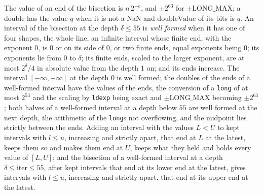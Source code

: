 \begin{lemma}\label{lem:bisection}
  \leanok
  The value of an end of the bisection is $n\,2^{-e}$, and $\pm 2^{63}$ for $\pm\mathrm{LONG\_MAX}$;
  a double has the value $q$ when it is not a NaN and $\mathrm{doubleValue}$ of its bits is $q$. An
  interval of the bisection at the depth $\delta \le 55$ is \emph{well formed} when it has one of
  four shapes, the whole line, an infinite interval whose finite end, with the exponent $0$, is $0$
  or on its side of $0$, or two finite ends, equal exponents being $0$; its exponents lie from $0$
  to $\delta$; its finite ends, scaled to the larger exponent, are at most $2^{\delta}/4$ in
  absolute value from the depth $1$ on; and its ends increase. The interval $[-\infty, +\infty]$ at
  the depth $0$ is well formed; the doubles of the ends of a well-formed interval have the values of
  the ends, the conversion of a \verb|long| of at most $2^{53}$ and the scaling by \verb|ldexp|
  being exact and $\pm\mathrm{LONG\_MAX}$ becoming $\pm 2^{63}$; both halves of a well-formed
  interval at a depth below $55$ are well formed at the next depth, the arithmetic of the
  \verb|long|s not overflowing, and the midpoint lies strictly between the ends. Adding an interval
  with the values $L < U$ to kept intervals with $l \le u$, increasing and strictly apart, that end
  at $L$ at the latest, keeps them so and makes them end at $U$, keeps what they held and holds
  every value of $[L, U]$; and the bisection of a well-formed interval at a depth
  $\delta \le \mathrm{iter} \le 55$, after kept intervals that end at its lower end at the latest,
  gives intervals with $l \le u$, increasing and strictly apart, that end at its upper end at the
  latest.
\end{lemma}

